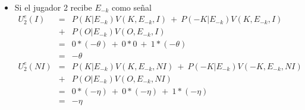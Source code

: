 {\begin{enumerate}
\begin{enumerate}
\begin{enumerate}
\begin{itemize}
\begin{eqnarray*}
                U_{2}^{e}(I)&=&P(K|E_k)V(K,E_k,I)\ +\ P(-K|E_k)V(-K,E_k,I)\\
                            &+&P(O|E_k)V(O,E_k,I)\\
                            &=&0.5*0\ +\ 0.5*(-\theta)\ + \ 0*(-\theta)\\
                            &=&0.5*(-\theta)\\
                U_{2}^{e}(NI)&=&P(K|E_k)V(K,E_k,NI)\ +\ P(-K|E_k)V(-K,E_k,NI)\\ 
                             &+&P(O|E_k)V(O,E_k,NI)\\
                             &=&0.5*(-\eta)\ +\ 0.5*(-\eta)\ + \ 0*(-\eta)\\
                             &=&-\eta
            \end{eqnarray*}

            La mejor respuesta del jugador 2 si recibe un señal $E_k$ es:
            \begin{equation*}
                \gamma_2(E_k)=
                \begin{cases}
                    I \text{ si } \eta \geq 0.5\theta \\
                    NI \text{ si } \eta < 0.5\theta \\
                \end{cases}    
            \end{equation*}
                
        \item Si el jugador 2 recibe $E_{-k}$ como señal
            \begin{eqnarray*}
                U_{2}^{e}(I)&=&P(K|E_{-k})V(K,E_{-k},I)\ +\ P(-K|E_{-k})V(K,E_{-k},I)\\
                            &+&P(O|E_{-k})V(O,E_{-k},I)\\
                            &=&0*(-\theta)\ +\ 0*0\ + \ 1*(-\theta)\\
                            &=&-\theta\\
                U_{2}^{e}(NI)&=&P(K|E_{-k})V(K,E_{-k},NI)\ +\ P(-K|E_{-k})V(-K,E_{-k},NI)\\
                             &+&P(O|E_{-k})V(O,E_{-k},NI)\\
                             &=&0*(-\eta)\ +\ 0*(-\eta)\ + \ 1*(-\eta)\\
                             &=&-\eta
            \end{eqnarray*}


\end{itemize}
\end{enumerate}
\end{enumerate}
\end{enumerate}}
